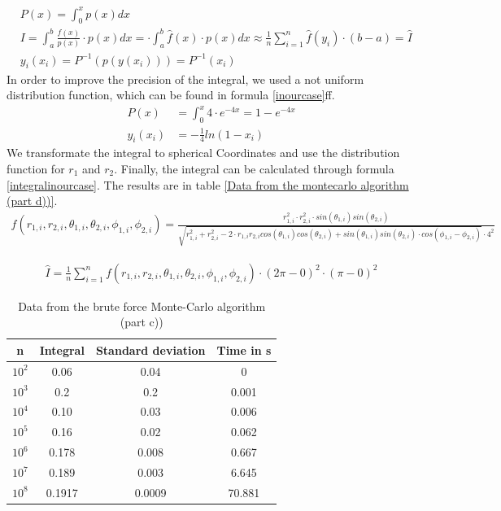 \documentclass[10pt,a4paper]{article}
\begin{document}
\begin{align}
&P(x) = \int_{0}^{x} p(x) dx \label{P(x)}\\
& I =  \int_{a}^{b} \frac{f(x)}{p(x)} \cdot p(x) dx = \cdot \int_{a}^{b} \hat{f}(x) \cdot p(x) dx \approx  \frac{1}{n} \sum_{i=1}^{n} \hat{f}(y_i) \cdot (b-a) = \hat{I} \\
&y_i(x_i) =P^{-1}\left(p(y(x_i))\right)= P^{-1}(x_i)\label{with distribution}
\end{align}
In order to improve the precision of the integral, we used a not uniform distribution function, which can be found in formula \ref{inourcase}ff. 
\begin{align}
P(x)&= \int_{0}^{x} 4 \cdot e^{-4 x} = 1- e^{-4x} \label{inourcase}\\
y_i(x_i)&= -\frac{1}{4} ln(1-x_i)
\end{align}
We transformate the integral to spherical Coordinates and use the distribution function for $r_1$ and $r_2$. Finally, the integral can be calculated through formula \ref{integralinourcase}. The results are in table \ref{Data from the  montecarlo algorithm (part d))}.
\begin{align}
f( r_{1,i}, r_{2,i}, \theta_{1,i}, \theta_{2,i}, \phi_{1,i}, \phi_{2,i}) = \frac{r_{1,i}^2 \cdot r_{2,i}^2 \cdot sin(\theta_{1,i}) sin(\theta_{2,i}) }{\sqrt{r_{1,i}^2+r_{2,i}^2-2 \cdot r_{1,i} r_{2,i}  cos(\theta_{1,i}) cos(\theta_{2,i}) + sin(\theta_{1,i}) sin(\theta_{2,i}) \cdot cos(\phi_{1,i}-\phi_{2,i})}\cdot 4^2}
\end{align}

\begin{align}
\hat{I}= \frac{1}{n} \sum_{i=1}^{n} f( r_{1,i}, r_{2,i}, \theta_{1,i}, \theta_{2,i}, \phi_{1,i}, \phi_{2,i}) \cdot (2 \pi - 0)^2 \cdot (\pi -0)^2  \label{integralinourcase}
\end{align}

\begin{table}[h]
\centering
\caption{Data from the brute force Monte-Carlo algorithm (part c))}
\label{Data from the brute force montecarlo algorithm (part c))}
\begin{tabular}{c|c|c|c}
n & Integral & Standard deviation & Time in s \\
\hline\hline
$10^2$ & 0.06 & 0.04 & 0 \\
$10^3$ & 0.2 & 0.2 & 0.001 \\
$10^4$ & 0.10 & 0.03 & 0.006 \\
$10^5$ & 0.16 & 0.02 & 0.062 \\
$10^6$ & 0.178 & 0.008 & 0.667 \\
$10^7$ & 0.189 & 0.003 & 6.645 \\
$10^8$ & 0.1917 & 0.0009 & 70.881 
\end{tabular}
\end{table}
\end{document}
